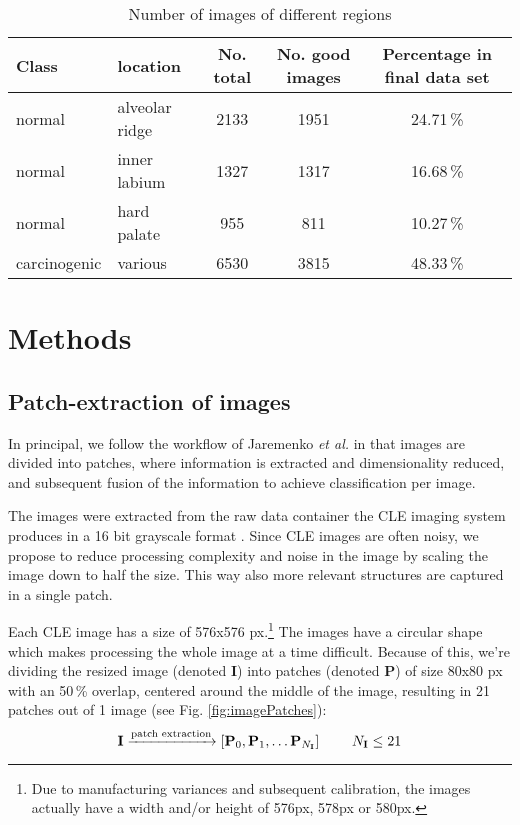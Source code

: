 \documentclass[fleqn,10pt]{wlscirep}
\begin{document}
\begin{table*}\centering\begin{tabular}{l|l|c|c|c}
  Class & location & No. total & No. good images & Percentage in final data set  \\
  \hline
  normal & alveolar ridge & 2133 & 1951 & 24.71\,\%\\
  normal & inner labium & 1327 & 1317 & 16.68\,\% \\
  normal & hard palate & 955 & 811 & 10.27\,\% \\
  carcinogenic & various & 6530 & 3815 & 48.33\,\% \\
\end{tabular}
\caption{Number of images of different regions}
\label{tab:locations}
\end{table*}


\section{Methods}


\subsection{Patch-extraction of images}

In principal, we follow the workflow of Jaremenko \textit{et al.} \cite{Jaremenko:2015kh} in that images are divided into patches, where information is extracted and dimensionality reduced, and subsequent fusion of the information to achieve classification per image.
 
The images were extracted from the raw data container the CLE imaging
system produces in a 16 bit grayscale format \cite{Aubreville:2016}.
Since CLE images are often noisy, we propose to reduce processing complexity and noise in the image by scaling the image down to half the size. This way also more relevant structures are captured in a single patch.  

Each CLE image has a size of 576x576 px.\footnote{Due to
  manufacturing variances and subsequent calibration, the images
  actually have a width and/or height of 576px, 578px or 580px.}
The images have a circular shape which makes processing the whole
image at a time difficult. Because of this, we're dividing the resized
image (denoted $\textbf{I}$)  into
patches (denoted $\textbf{P}$) of size 80x80 px with an 50\,\% overlap, centered
around the middle of the image, resulting in 21
patches out of 1 image (see Fig. \ref{fig:imagePatches}):
\begin{equation}
 \textbf{I} \xrightarrow{\textrm{patch extraction}} \left[{
    \textbf{P}_0, \textbf{P}_1, \dots \textbf{P}_{N_\textbf{I}}}
    \right] \hspace{0.3in} N_\textbf{I} \leq 21 
\end{equation}
\end{document}
